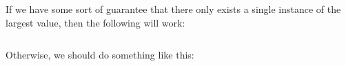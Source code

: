 If we have some sort of guarantee that there only exists a single instance of the largest value, then the following will work:

\inputminted{csharp}{\context/answer/index/Index.cs}

Otherwise, we should do something like this:

\inputminted{csharp}{\context/answer/indexAll/IndexAll.cs}

